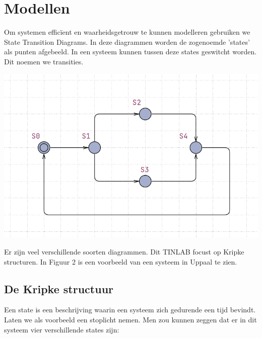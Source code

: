 \documentclass{article}
\begin{document}
	\newpage
	
	
	\section{Modellen}
	
	Om systemen efficïent en waarheidsgetrouw te kunnen modelleren gebruiken we State Transition Diagrams. In deze diagrammen worden de zogenoemde 'states' als punten afgebeeld. In een systeem kunnen tussen deze states geswitcht worden. Dit noemen we transities. 
		\begin{center}
			\begin{minipage}{0.8\textwidth}
				\includegraphics[width=\textwidth]{voorbeeld-state-transition-diagram.png}
			\end{minipage}
			\hfill
		\end{center}
	Er zijn veel verschillende soorten diagrammen. Dit TINLAB focust op Kripke structuren. In Figuur 2 is een voorbeeld van een systeem in Uppaal te zien. 
	
		\subsection{De Kripke structuur}
		
		Een state is een beschrijving waarin een systeem zich gedurende een tijd bevindt. \\
		Laten we als voorbeeld een stoplicht nemen. Men zou kunnen zeggen dat er in dit systeem vier verschillende states zijn:
\end{document}
